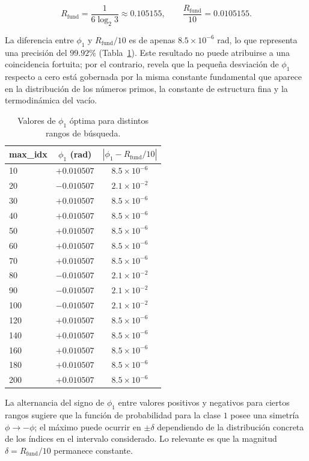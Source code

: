 \documentclass[12pt,a4paper]{article}
\theoremstyle{plain}
\theoremstyle{definition}
\theoremstyle{remark}
\newcommand{\Rfund}{R_{\text{fund}}}
\newcommand{\Rfund}{R_{\text{fund}}}
\begin{document}
\begin{equation}
\Rfund = \frac{1}{6\log_2 3} \approx 0.105155, \qquad \frac{\Rfund}{10} = 0.0105155.
\end{equation}

La diferencia entre $\phi_1$ y $\Rfund/10$ es de apenas $8.5\times 10^{-6}$ rad, lo que representa una precisión del $99.92\%$ (Tabla~\ref{tab:phi1_vs_range}). Este resultado no puede atribuirse a una coincidencia fortuita; por el contrario, revela que la pequeña desviación de $\phi_1$ respecto a cero está gobernada por la misma constante fundamental que aparece en la distribución de los números primos, la constante de estructura fina y la termodinámica del vacío.

\begin{table}[h]
\caption{Valores de $\phi_1$ óptima para distintos rangos de búsqueda.}
\label{tab:phi1_vs_range}
\begin{tabular}{lcc}
\toprule
\textbf{max\_idx} & $\phi_1$ (rad) & $|\phi_1 - \Rfund/10|$ \\
\midrule
10  & $+0.010507$ & $8.5\times10^{-6}$ \\
20  & $-0.010507$ & $2.1\times10^{-2}$ \\
30  & $+0.010507$ & $8.5\times10^{-6}$ \\
40  & $+0.010507$ & $8.5\times10^{-6}$ \\
50  & $+0.010507$ & $8.5\times10^{-6}$ \\
60  & $+0.010507$ & $8.5\times10^{-6}$ \\
70  & $+0.010507$ & $8.5\times10^{-6}$ \\
80  & $-0.010507$ & $2.1\times10^{-2}$ \\
90  & $-0.010507$ & $2.1\times10^{-2}$ \\
100 & $-0.010507$ & $2.1\times10^{-2}$ \\
120 & $+0.010507$ & $8.5\times10^{-6}$ \\
140 & $+0.010507$ & $8.5\times10^{-6}$ \\
160 & $+0.010507$ & $8.5\times10^{-6}$ \\
180 & $+0.010507$ & $8.5\times10^{-6}$ \\
200 & $+0.010507$ & $8.5\times10^{-6}$ \\
\bottomrule
\end{tabular}
\end{table}

La alternancia del signo de $\phi_1$ entre valores positivos y negativos para ciertos rangos sugiere que la función de probabilidad para la clase $1$ posee una simetría $\phi \to -\phi$; el máximo puede ocurrir en $\pm\delta$ dependiendo de la distribución concreta de los índices en el intervalo considerado. Lo relevante es que la magnitud $\delta = \Rfund/10$ permanece constante.
\end{document}
